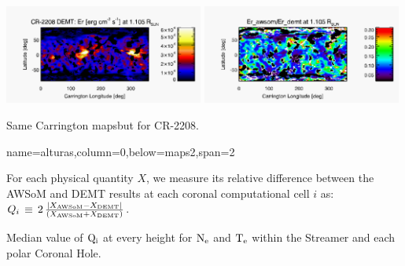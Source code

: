 \documentclass[paperwidth=100cm,paperheight=120cm]{baposter}
\def\azul#1{\textcolor{blue}{#1}}
\begin{document}
\begin{poster}
{{\begin{center}
{\includegraphics[width=0.49\textwidth]{map_Er_CR2208_DEMT-EUVI_behind_H1-L502020_r3d_1105_Rsun.pdf}}
{\includegraphics[width=0.49\textwidth]{map_ratio_qrad_awsom_2208_185-Er_CR2208_DEMT-EUVI_behind_H1-L502020_r3d_1105_Rsun.pdf}}\\
\end{center}
Same Carrington mapsbut for CR-2208.
}
}

{name=alturas,column=0,below=maps2,span=2}{
{\footnotesize\sf
For each physical quantity $X$, we measure its relative difference between the AWSoM and DEMT results at each coronal computational cell $i$ as: 
$Q_i\,\equiv\,2\,\frac{|X_{\rm AWSoM} - X_{\rm DEMT}|}{(X_{\rm AWSoM} + X_{\rm DEMT})}$.
\begin{center}
\end{center}
\vskip -0.16cm
Median value of ${\rm Q_i}$ at every height for ${\rm N_e}$ and ${\rm T_e}$ within the Streamer and each polar Coronal Hole.

}
}


\end{poster}
\end{document}
